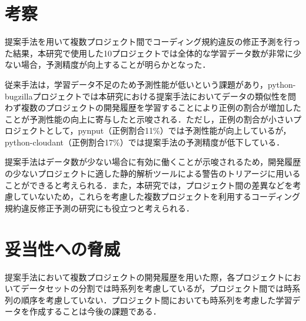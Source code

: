 \documentclass[T,J]{fose} %
\newcommand{\todo}[1]{\colorbox{yellow}{{\bf TODO}:}{\color{red} {\textbf{[#1]}}}}
\begin{document}
\section{考察}\label{sec:consideration}
提案手法を用いて複数プロジェクト間でコーディング規約違反の修正予測を行った結果，本研究で使用した10プロジェクトでは全体的な学習データ数が非常に少ない場合，予測精度が向上することが明らかとなった．


従来手法は，学習データ不足のため予測性能が低いという課題があり，python-bugzillaプロジェクトでは本研究における提案手法においてデータの類似性を問わず複数のプロジェクトの開発履歴を学習することにより正例の割合が増加したことが予測性能の向上に寄与したと示唆される．ただし，正例の割合が小さいプロジェクトとして，pynput（正例割合11\%）では予測性能が向上しているが，python-cloudant（正例割合17\%）では提案手法の予測精度が低下している．

提案手法はデータ数が少ない場合に有効に働くことが示唆されるため，開発履歴の少ないプロジェクトに適した静的解析ツールによる警告のトリアージに用いることができると考えられる．また，本研究では，プロジェクト間の差異などを考慮していないため，これらを考慮した複数プロジェクトを利用するコーディング規約違反修正予測の研究にも役立つと考えられる．


\section{妥当性への脅威}\label{sec:heuristic}

提案手法において複数プロジェクトの開発履歴を用いた際，各プロジェクトにおいてデータセットの分割では時系列を考慮しているが，プロジェクト間では時系列の順序を考慮していない．プロジェクト間においても時系列を考慮した学習データを作成することは今後の課題である．
\end{document}
